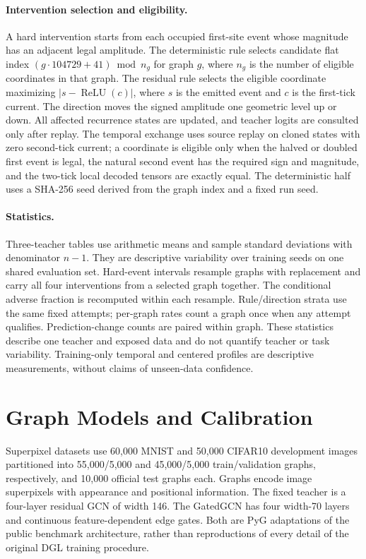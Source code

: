 \documentclass[10pt,twocolumn,letterpaper]{article}
\begin{document}
\paragraph{Intervention selection and eligibility.} A hard intervention starts from each occupied first-site event whose magnitude has an adjacent legal amplitude. The deterministic rule selects candidate flat index $(g\cdot104729+41)\bmod n_g$ for graph $g$, where $n_g$ is the number of eligible coordinates in that graph. The residual rule selects the eligible coordinate maximizing $|s-\operatorname{ReLU}(c)|$, where $s$ is the emitted event and $c$ is the first-tick current. The direction moves the signed amplitude one geometric level up or down. All affected recurrence states are updated, and teacher logits are consulted only after replay. The temporal exchange uses source replay on cloned states with zero second-tick current; a coordinate is eligible only when the halved or doubled first event is legal, the natural second event has the required sign and magnitude, and the two-tick local decoded tensors are exactly equal. The deterministic half uses a SHA-256 seed derived from the graph index and a fixed run seed.

\paragraph{Statistics.} Three-teacher tables use arithmetic means and sample standard deviations with denominator $n-1$. They are descriptive variability over training seeds on one shared evaluation set. Hard-event intervals resample graphs with replacement and carry all four interventions from a selected graph together. The conditional adverse fraction is recomputed within each resample. Rule/direction strata use the same fixed attempts; per-graph rates count a graph once when any attempt qualifies. Prediction-change counts are paired within graph. These statistics describe one teacher and exposed data and do not quantify teacher or task variability. Training-only temporal and centered profiles are descriptive measurements, without claims of unseen-data confidence.

\section{Graph Models and Calibration}
Superpixel datasets use 60,000 MNIST and 50,000 CIFAR10 development images partitioned into 55,000/5,000 and 45,000/5,000 train/validation graphs, respectively, and 10,000 official test graphs each. Graphs encode image superpixels with appearance and positional information. The fixed teacher is a four-layer residual GCN of width 146. The GatedGCN has four width-70 layers and continuous feature-dependent edge gates. Both are PyG adaptations of the public benchmark architecture, rather than reproductions of every detail of the original DGL training procedure.
\end{document}

